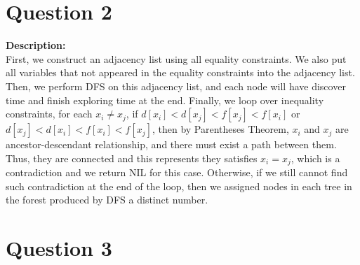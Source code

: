 \documentclass[10pt]{article}
\begin{document}
\section*{Question 2}
\textbf{Description:}\\
 First, we construct an adjacency list using all equality constraints. We also put all variables that not appeared in the equality constraints into the adjacency list. Then, we perform DFS on this adjacency list, and each node will have discover time and finish exploring time at the end. Finally, we loop over inequality constraints, for each $x_i \neq x_j$, if $d[x_i] < d[x_j] < f[x_j] < f[x_i]$ or $d[x_j] < d[x_i] < f[x_i] < f[x_j]$, then by Parentheses Theorem, $x_i$ and $x_j$ are ancestor-descendant relationship, and there must exist a path between them. Thus, they are connected and this represents they satisfies $x_i = x_j$, which is a contradiction and we return NIL for this case. Otherwise, if we still cannot find such contradiction at the end of the loop, then we assigned nodes in each tree in the forest produced by DFS a distinct number.
\section*{Question 3}
\end{document}
